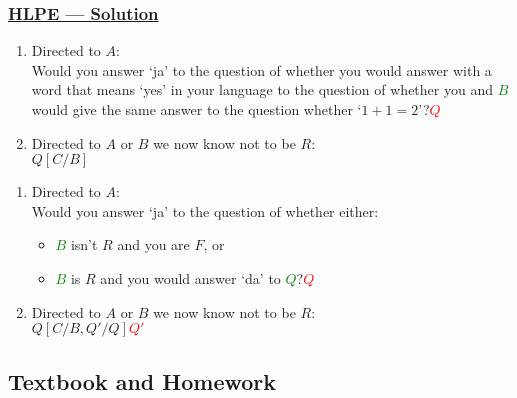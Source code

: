 \documentclass[UTF8,aspectratio=43,11pt,colorlinks,compress,openany]{beamer}%
\begin{document}
\begin{frame}\frametitle{\href{http://philsci-archive.pitt.edu/9490/1/devious.pdf}{HLPE --- Solution}}
\vspace{-3pt}
\setlength\abovedisplayskip{0pt}
\setlength\belowdisplayskip{0pt}
	\begin{solution}
		\begin{enumerate}
			\item Directed to $A$:\\
			Would you answer `ja' to the question of whether you would answer with a word that means `yes' in your language to the question of whether you and \textcolor{green}{$B$} would give the same answer to the question whether `$1+1=2$'?\hfill \textcolor{red}{$Q$}
			\item Directed to $A$ or $B$ we now know not to be $R$:\\
			$Q[C/B]$
		\end{enumerate}
	\end{solution}\vspace{-1ex}
	\begin{solution}
		\begin{enumerate}
			\item Directed to $A$:\\
			Would you answer `ja' to the question of whether either:
			\begin{itemize}
				\item \textcolor{green}{$B$} isn't $R$ and you are $F$, or
				\item \textcolor{green}{$B$} is $R$ and you would answer `da' to \textcolor{green}{$Q$}?\hfill \textcolor{red}{$Q$}
			\end{itemize}
			\item Directed to $A$ or $B$ we now know not to be $R$:\\
			$Q[C/B,Q'/Q]$\hfill \textcolor{red}{$Q'$}
		\end{enumerate}
	\end{solution}
\end{frame}

\subsection{Textbook and Homework}
\end{document}
